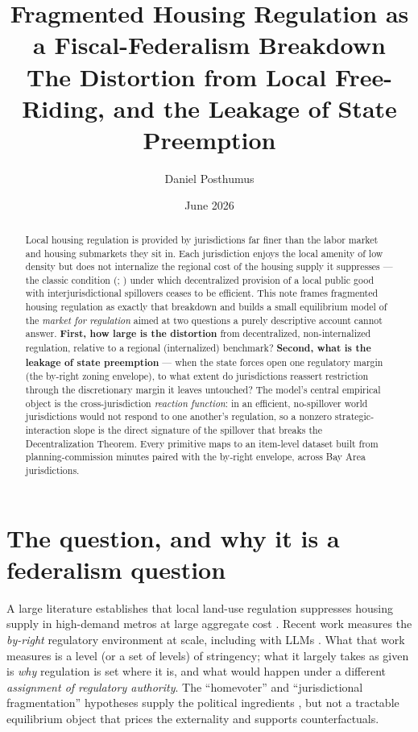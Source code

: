 \documentclass[11pt]{article}
\title{Fragmented Housing Regulation as a Fiscal-Federalism Breakdown\\
\large The Distortion from Local Free-Riding, and the Leakage of State Preemption}
\author{Daniel Posthumus}
\date{June 2026}
\begin{document}
\maketitle

\begin{abstract}
\noindent Local housing regulation is provided by jurisdictions far finer than the labor
market and housing submarkets they sit in. Each jurisdiction enjoys the local amenity of low
density but does not internalize the regional cost of the housing supply it suppresses --- the
classic condition (\citealp{oates1972fiscal}; \citealp{besley2003centralized}) under which
decentralized provision of a local public good with interjurisdictional spillovers ceases to
be efficient. This note frames fragmented housing regulation as exactly that breakdown and
builds a small equilibrium model of the \emph{market for regulation} aimed at two questions a
purely descriptive account cannot answer. \textbf{First, how large is the distortion} from
decentralized, non-internalized regulation, relative to a regional (internalized) benchmark?
\textbf{Second, what is the leakage of state preemption} --- when the state forces open one
regulatory margin (the by-right zoning envelope), to what extent do jurisdictions reassert
restriction through the discretionary margin it leaves untouched? The model's central
empirical object is the cross-jurisdiction \emph{reaction function}: in an efficient,
no-spillover world jurisdictions would not respond to one another's regulation, so a nonzero
strategic-interaction slope is the direct signature of the spillover that breaks the
Decentralization Theorem. Every primitive maps to an item-level dataset built from
planning-commission minutes paired with the by-right envelope, across Bay Area jurisdictions.
\end{abstract}

\tableofcontents

\section{The question, and why it is a federalism question}

A large literature establishes that local land-use regulation suppresses housing supply in
high-demand metros at large aggregate cost \citep{glaeser2005,hsieh2019housing,glaeser2009causes}.
Recent work measures the \emph{by-right} regulatory environment at scale, including with LLMs
\citep{bartik2024costs,gyourko2021local}. What that work measures is a level (or a set of
levels) of stringency; what it largely takes as given is \emph{why} regulation is set where it
is, and what would happen under a different \emph{assignment of regulatory authority}. The
``homevoter'' and ``jurisdictional fragmentation'' hypotheses supply the political ingredients
\citep{fischel2004economic,fischel2001homevoter,elmendorf2025homevoter,ortalo2014political},
but not a tractable equilibrium object that prices the externality and supports counterfactuals.
\end{document}
